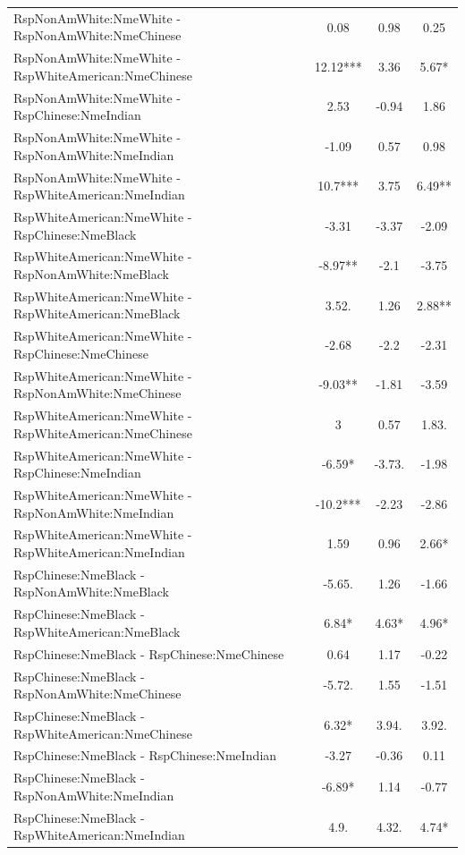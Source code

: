 \documentclass[]{report}
\begin{document}
\begin{table}
{\begin{tabular}[t]{lccc}
		RspNonAmWhite:NmeWhite - RspNonAmWhite:NmeChinese & 0.08 & 0.98 & 0.25 \\ 
		RspNonAmWhite:NmeWhite - RspWhiteAmerican:NmeChinese & 12.12*** & 3.36 & 5.67* \\ 
		RspNonAmWhite:NmeWhite - RspChinese:NmeIndian & 2.53 & -0.94 & 1.86 \\ 
		RspNonAmWhite:NmeWhite - RspNonAmWhite:NmeIndian & -1.09 & 0.57 & 0.98 \\ 
		RspNonAmWhite:NmeWhite - RspWhiteAmerican:NmeIndian & 10.7*** & 3.75 & 6.49** \\ 
		RspWhiteAmerican:NmeWhite - RspChinese:NmeBlack & -3.31 & -3.37 & -2.09 \\ 
		RspWhiteAmerican:NmeWhite - RspNonAmWhite:NmeBlack & -8.97** & -2.1 & -3.75 \\ 
		RspWhiteAmerican:NmeWhite - RspWhiteAmerican:NmeBlack & 3.52. & 1.26 & 2.88** \\ 
		RspWhiteAmerican:NmeWhite - RspChinese:NmeChinese & -2.68 & -2.2 & -2.31 \\ 
		RspWhiteAmerican:NmeWhite - RspNonAmWhite:NmeChinese & -9.03** & -1.81 & -3.59 \\ 
		RspWhiteAmerican:NmeWhite - RspWhiteAmerican:NmeChinese & 3 & 0.57 & 1.83. \\ 
		RspWhiteAmerican:NmeWhite - RspChinese:NmeIndian & -6.59* & -3.73. & -1.98 \\ 
		RspWhiteAmerican:NmeWhite - RspNonAmWhite:NmeIndian & -10.2*** & -2.23 & -2.86 \\ 
		RspWhiteAmerican:NmeWhite - RspWhiteAmerican:NmeIndian & 1.59 & 0.96 & 2.66* \\ 
		RspChinese:NmeBlack - RspNonAmWhite:NmeBlack & -5.65. & 1.26 & -1.66 \\ 
		RspChinese:NmeBlack - RspWhiteAmerican:NmeBlack & 6.84* & 4.63* & 4.96* \\ 
		RspChinese:NmeBlack - RspChinese:NmeChinese & 0.64 & 1.17 & -0.22 \\ 
		RspChinese:NmeBlack - RspNonAmWhite:NmeChinese & -5.72. & 1.55 & -1.51 \\ 
		RspChinese:NmeBlack - RspWhiteAmerican:NmeChinese & 6.32* & 3.94. & 3.92. \\ 
		RspChinese:NmeBlack - RspChinese:NmeIndian & -3.27 & -0.36 & 0.11 \\ 
		RspChinese:NmeBlack - RspNonAmWhite:NmeIndian & -6.89* & 1.14 & -0.77 \\ 
		RspChinese:NmeBlack - RspWhiteAmerican:NmeIndian & 4.9. & 4.32. & 4.74* \\ 

\end{tabular}}
\end{table}
\end{document}
